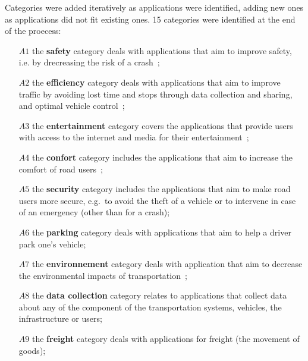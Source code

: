Categories were added iteratively as applications were identified, adding new ones as applications did not fit existing ones. 15 categories were identified at the end of the proecess: 

\begin{enumerate}
\item[$A1$] the \textbf{safety} category deals with applications that aim to improve safety, i.e. by drecreasing the risk of a crash~\cite{hamida_security_2015};
\item[$A2$] the \textbf{efficiency} category deals with applications that aim to improve traffic by avoiding lost time and stops through data collection and sharing, and optimal vehicle control~\cite{hamida_security_2015};
\item[$A3$] the \textbf{entertainment} category covers the applications that provide users with access to the internet and media for their entertainment~\cite{hamida_security_2015};
\item[$A4$] the \textbf{confort} category includes the applications that aim to increase the comfort of road users~\cite{hamida_security_2015};
\item[$A5$] the \textbf{security} category includes the applications that aim to make road users more secure, e.g.\ to avoid the theft of a vehicle or to intervene in case of an emergency (other than for a crash); 
\item[$A6$] the \textbf{parking} category deals with applications that aim to help a driver park one's vehicle; 
\item[$A7$] the \textbf{environnement} category deals with application that aim to decrease the environmental impacts of transportation~\cite{chang_estimated_2015};
\item[$A8$] the \textbf{data collection} category relates to applications that collect data about any of the component of the transportation systems, vehicles, the infrastructure or users;   
\item[$A9$] the \textbf{freight} category deals with applications for freight (the movement of goods);

\end{enumerate}

